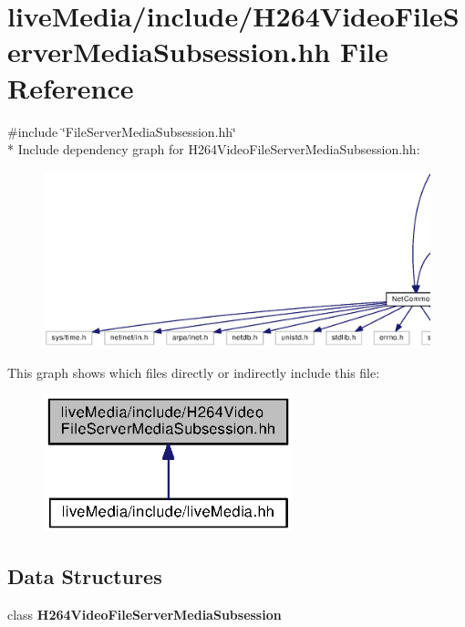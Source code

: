 \section{live\+Media/include/\+H264\+Video\+File\+Server\+Media\+Subsession.hh File Reference}
\label{H264VideoFileServerMediaSubsession_8hh}
{\ttfamily \#include \char`\"{}File\+Server\+Media\+Subsession.\+hh\char`\"{}}\\*
Include dependency graph for H264\+Video\+File\+Server\+Media\+Subsession.\+hh\+:
\nopagebreak
\begin{figure}[H]
\begin{center}
\leavevmode
\includegraphics[width=350pt]{H264VideoFileServerMediaSubsession_8hh__incl}
\end{center}
\end{figure}
This graph shows which files directly or indirectly include this file\+:
\nopagebreak
\begin{figure}[H]
\begin{center}
\leavevmode
\includegraphics[width=205pt]{H264VideoFileServerMediaSubsession_8hh__dep__incl}
\end{center}
\end{figure}
\subsection*{Data Structures}
\begin{DoxyCompactItemize}
\item 
class {\bf H264\+Video\+File\+Server\+Media\+Subsession}
\end{DoxyCompactItemize}
